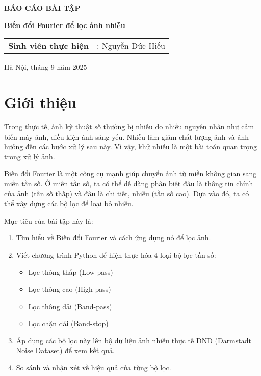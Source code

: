 \documentclass[12pt, a4paper]{article}
\begin{document}
	
	\begin{titlepage}
		\centering
		\vspace*{1cm}

		\vspace{3cm}
		{\Huge\bfseries BÁO CÁO BÀI TẬP \par}
		\vspace{1cm}
	
		\vspace{1.5cm}
	
		\vspace{0.5cm}
		{\LARGE\bfseries Biến đổi Fourier để lọc ảnh nhiễu\par}
		\vspace{2cm}
		\begin{flushleft}
			\large
			\begin{tabular}{ll}
				\textbf{Sinh viên thực hiện} & : Nguyễn Đức Hiếu \\
			
			\end{tabular}
		\end{flushleft}
		\vspace*{\fill}
		{\large Hà Nội, tháng 9 năm 2025\par}
	\end{titlepage}
	
	\tableofcontents
	\newpage
	\listoffigures
	\newpage
	
	\section{Giới thiệu }
	Trong thực tế, ảnh kỹ thuật số thường bị nhiễu do nhiều nguyên nhân như cảm biến máy ảnh, điều kiện ánh sáng yếu. Nhiễu làm giảm chất lượng ảnh và ảnh hưởng đến các bước xử lý sau này. Vì vậy, khử nhiễu là một bài toán quan trọng trong xử lý ảnh.
	
	Biến đổi Fourier là một công cụ mạnh giúp chuyển ảnh từ miền không gian sang miền tần số. Ở miền tần số, ta có thể dễ dàng phân biệt đâu là thông tin chính của ảnh (tần số thấp) và đâu là chi tiết, nhiễu (tần số cao). Dựa vào đó, ta có thể xây dựng các bộ lọc để loại bỏ nhiễu.
	
	Mục tiêu của bài tập này là:
	\begin{enumerate}
		\item Tìm hiểu về Biến đổi Fourier và cách ứng dụng nó để lọc ảnh.
		\item Viết chương trình Python để hiện thực hóa 4 loại bộ lọc tần số:
		\begin{itemize}
			\item Lọc thông thấp (Low-pass)
			\item Lọc thông cao (High-pass)
			\item Lọc thông dải (Band-pass)
			\item Lọc chặn dải (Band-stop)
		\end{itemize}
		\item Áp dụng các bộ lọc này lên bộ dữ liệu ảnh nhiễu thực tế DND (Darmstadt Noise Dataset) \cite{plotz2017benchmark} để xem kết quả.
		\item So sánh và nhận xét về hiệu quả của từng bộ lọc.
	\end{enumerate}
	
\end{document}
